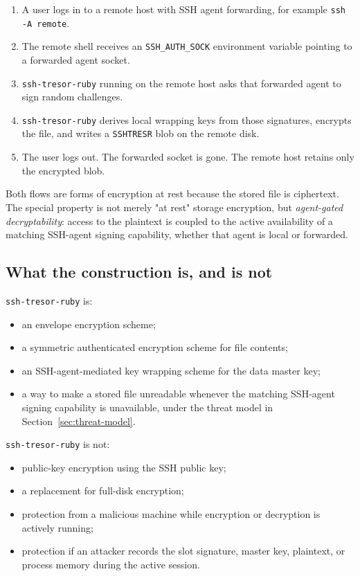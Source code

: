 \documentclass[11pt]{article}
\theoremstyle{definition}
\theoremstyle{plain}
\newcommand{\Project}{\texttt{ssh-tresor-ruby}}
\newcommand{\Tresor}{\texttt{SSHTRESR}}
\begin{document}
\begin{enumerate}[leftmargin=*]
  \item A user logs in to a remote host with SSH agent forwarding, for example \texttt{ssh -A remote}.
  \item The remote shell receives an \texttt{SSH\_AUTH\_SOCK} environment variable pointing to a forwarded agent socket.
  \item \Project{} running on the remote host asks that forwarded agent to sign random challenges.
  \item \Project{} derives local wrapping keys from those signatures, encrypts the file, and writes a \Tresor{} blob on the remote disk.
  \item The user logs out. The forwarded socket is gone. The remote host retains only the encrypted blob.
\end{enumerate}

Both flows are forms of encryption at rest because the stored file is ciphertext. The special property is not merely "at rest" storage encryption, but \emph{agent-gated decryptability}: access to the plaintext is coupled to the active availability of a matching SSH-agent signing capability, whether that agent is local or forwarded.

\subsection{What the construction is, and is not}

\Project{} is:

\begin{itemize}[leftmargin=*]
  \item an envelope encryption scheme;
  \item a symmetric authenticated encryption scheme for file contents;
  \item an SSH-agent-mediated key wrapping scheme for the data master key;
  \item a way to make a stored file unreadable whenever the matching SSH-agent signing capability is unavailable, under the threat model in Section~\ref{sec:threat-model}.
\end{itemize}

\Project{} is not:

\begin{itemize}[leftmargin=*]
  \item public-key encryption using the SSH public key;
  \item a replacement for full-disk encryption;
  \item protection from a malicious machine while encryption or decryption is actively running;
  \item protection if an attacker records the slot signature, master key, plaintext, or process memory during the active session.
\end{itemize}
\end{document}
